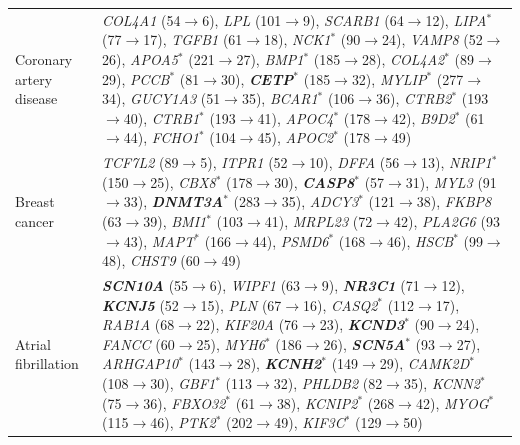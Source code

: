\begin{table}[!htbp]
\begin{tabular*}{\linewidth}{@{\extracolsep{\fill}}p{}>{\raggedright\arraybackslash}p{}}
Coronary artery disease & \textit{COL4A1} (54$\rightarrow$6), \textit{LPL} (101$\rightarrow$9), \textit{SCARB1} (64$\rightarrow$12), \textit{LIPA}$^\ast$ (77$\rightarrow$17), \textit{TGFB1} (61$\rightarrow$18), \textit{NCK1}$^\ast$ (90$\rightarrow$24), \textit{VAMP8} (52$\rightarrow$26), \textit{APOA5}$^\ast$ (221$\rightarrow$27), \textit{BMP1}$^\ast$ (185$\rightarrow$28), \textit{COL4A2}$^\ast$ (89$\rightarrow$29), \textit{PCCB}$^\ast$ (81$\rightarrow$30), \textbf{\textit{CETP}}$^\ast$ (185$\rightarrow$32), \textit{MYLIP}$^\ast$ (277$\rightarrow$34), \textit{GUCY1A3} (51$\rightarrow$35), \textit{BCAR1}$^\ast$ (106$\rightarrow$36), \textit{CTRB2}$^\ast$ (193$\rightarrow$40), \textit{CTRB1}$^\ast$ (193$\rightarrow$41), \textit{APOC4}$^\ast$ (178$\rightarrow$42), \textit{B9D2}$^\ast$ (61$\rightarrow$44), \textit{FCHO1}$^\ast$ (104$\rightarrow$45), \textit{APOC2}$^\ast$ (178$\rightarrow$49) \\
Breast cancer & \textit{TCF7L2} (89$\rightarrow$5), \textit{ITPR1} (52$\rightarrow$10), \textit{DFFA} (56$\rightarrow$13), \textit{NRIP1}$^\ast$ (150$\rightarrow$25), \textit{CBX8}$^\ast$ (178$\rightarrow$30), \textbf{\textit{CASP8}}$^\ast$ (57$\rightarrow$31), \textit{MYL3} (91$\rightarrow$33), \textbf{\textit{DNMT3A}}$^\ast$ (283$\rightarrow$35), \textit{ADCY3}$^\ast$ (121$\rightarrow$38), \textit{FKBP8} (63$\rightarrow$39), \textit{BMI1}$^\ast$ (103$\rightarrow$41), \textit{MRPL23} (72$\rightarrow$42), \textit{PLA2G6} (93$\rightarrow$43), \textit{MAPT}$^\ast$ (166$\rightarrow$44), \textit{PSMD6}$^\ast$ (168$\rightarrow$46), \textit{HSCB}$^\ast$ (99$\rightarrow$48), \textit{CHST9} (60$\rightarrow$49) \\
Atrial fibrillation & \textbf{\textit{SCN10A}} (55$\rightarrow$6), \textit{WIPF1} (63$\rightarrow$9), \textbf{\textit{NR3C1}} (71$\rightarrow$12), \textbf{\textit{KCNJ5}} (52$\rightarrow$15), \textit{PLN} (67$\rightarrow$16), \textit{CASQ2}$^\ast$ (112$\rightarrow$17), \textit{RAB1A} (68$\rightarrow$22), \textit{KIF20A} (76$\rightarrow$23), \textbf{\textit{KCND3}}$^\ast$ (90$\rightarrow$24), \textit{FANCC} (60$\rightarrow$25), \textit{MYH6}$^\ast$ (186$\rightarrow$26), \textbf{\textit{SCN5A}}$^\ast$ (93$\rightarrow$27), \textit{ARHGAP10}$^\ast$ (143$\rightarrow$28), \textbf{\textit{KCNH2}}$^\ast$ (149$\rightarrow$29), \textit{CAMK2D}$^\ast$ (108$\rightarrow$30), \textit{GBF1}$^\ast$ (113$\rightarrow$32), \textit{PHLDB2} (82$\rightarrow$35), \textit{KCNN2}$^\ast$ (75$\rightarrow$36), \textit{FBXO32}$^\ast$ (61$\rightarrow$38), \textit{KCNIP2}$^\ast$ (268$\rightarrow$42), \textit{MYOG}$^\ast$ (115$\rightarrow$46), \textit{PTK2}$^\ast$ (202$\rightarrow$49), \textit{KIF3C}$^\ast$ (129$\rightarrow$50) \\

\end{tabular*}
\end{table}
